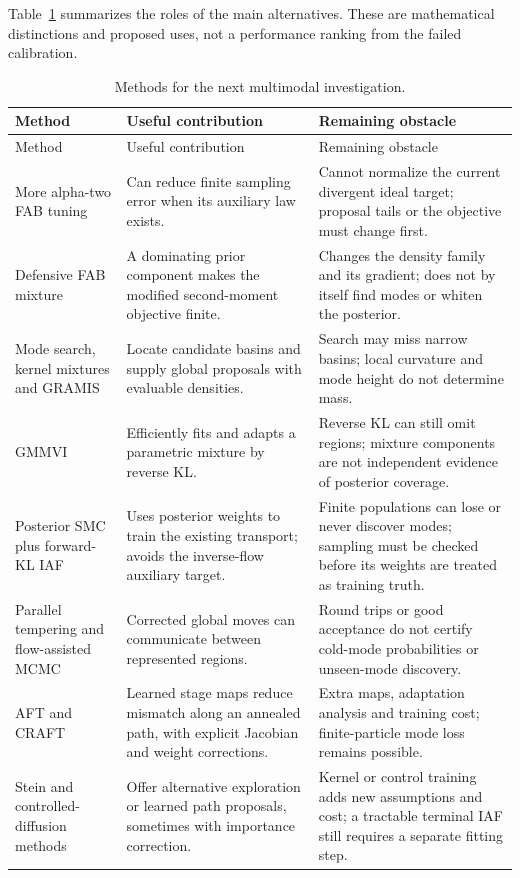 Table~\ref{tab:bf-is-coverage-options} summarizes the roles of the main
alternatives. These are mathematical distinctions and proposed uses, not a
performance ranking from the failed calibration.
\begingroup
\small
\begin{longtable}{@{}>{\raggedright\arraybackslash}p{}
>{\raggedright\arraybackslash}p{}
>{\raggedright\arraybackslash}p{}@{}}
\caption{Methods for the next multimodal investigation.}
\label{tab:bf-is-coverage-options}\\
\toprule
Method & Useful contribution & Remaining obstacle \\
\midrule
\endfirsthead
\toprule
Method & Useful contribution & Remaining obstacle \\
\midrule
\endhead
More alpha-two FAB tuning & Can reduce finite sampling error when its
auxiliary law exists. & Cannot normalize the current divergent ideal target;
proposal tails or the objective must change first. \\
Defensive FAB mixture & A dominating prior component makes the modified
second-moment objective finite. & Changes the density family and its
gradient; does not by itself find modes or whiten the posterior. \\
Mode search, kernel mixtures and GRAMIS & Locate candidate basins and supply
global proposals with evaluable densities. & Search may miss narrow basins;
local curvature and mode height do not determine mass. \\
GMMVI & Efficiently fits and adapts a parametric mixture by reverse KL.
& Reverse KL can still omit regions; mixture components are not independent
evidence of posterior coverage. \\
Posterior SMC plus forward-KL IAF & Uses posterior weights to train the
existing transport; avoids the inverse-flow auxiliary target. & Finite
populations can lose or never discover modes; sampling must be checked
before its weights are treated as training truth. \\
Parallel tempering and flow-assisted MCMC & Corrected global moves can
communicate between represented regions. & Round trips or good acceptance
do not certify cold-mode probabilities or unseen-mode discovery. \\
AFT and CRAFT & Learned stage maps reduce mismatch along an annealed path,
with explicit Jacobian and weight corrections. & Extra maps, adaptation
analysis and training cost; finite-particle mode loss remains possible. \\
Stein and controlled-diffusion methods & Offer alternative exploration or
learned path proposals, sometimes with importance correction. & Kernel or
control training adds new assumptions and cost; a tractable terminal IAF
still requires a separate fitting step. \\
\bottomrule
\end{longtable}
\endgroup

